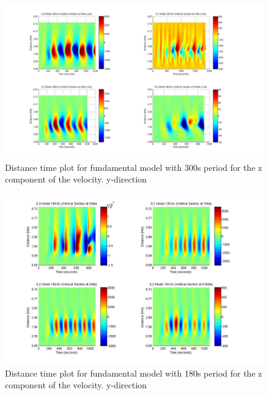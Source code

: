 \documentclass[authoryear,final,1p]{elsarticle}
\begin{document}

\begin{figure}[h]
\includegraphics[scale=0.3]{imagesn/dt_300_vert_y.jpg}
\caption{Distance time plot for fundamental model with 300s period for the z component of the velocity. y-direction }
\end{figure}


\begin{figure}[h]
\includegraphics[scale=0.3]{imagesn/dt_180_vert_y.jpg}
\caption{Distance time plot for fundamental model with 180s period for the z component of the velocity.  y-direction}
\end{figure}
\end{document}
